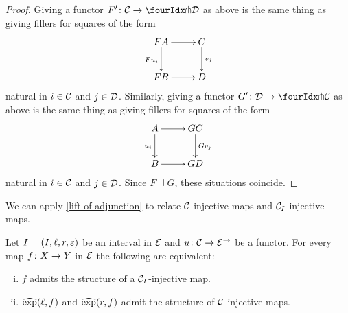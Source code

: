 \documentclass[reqno,10pt,a4paper,oneside]{amsart}
\begin{document}
\begin{proof} Giving a functor $F' \co \cal{C} \to \liftl{\cal{D}}$ as above is the same thing as giving fillers for squares of the form
\[
\xymatrix{
FA \ar[d]_{F u_i} \ar[r] & C \ar[d]^{v_j} \\
FB \ar[r] & D }
\]
natural in $i  \in \cal{C}$ and $j \in \cal{D}$. Similarly, giving a functor $G' \co \cal{D} \to \liftl{\cal{C}}$ as above is the same thing as giving fillers for squares 
of the form
\[
\xymatrix{
A \ar[d]_{u_i} \ar[r] & GC \ar[d]^{Gv_j} \\
B \ar[r] & GD }
\]
 natural in $i \in \cal{C}$ and $j \in \cal{D}$. Since $F \dashv G$, these situations coincide.
\end{proof}

We can apply \cref{lift-of-adjunction} to relate $\cal{C}$-injective maps and 
 $\cal{C}_\interval$-injective maps.


\begin{corollary} \label{prod-exp-general}
Let $\interval = (\interval, \intervall, \intervalr, \varepsilon)$ be an interval in $\catE$ and
 $u \co \cal{C} \to \catE^\to$ be a functor. For every map $f \co X \to Y$ in $\cal{E}$ 
 the following are equivalent: 
\begin{enumerate}[(i)]
\item $f$ admits the structure of a $\cal{C}_\interval$-injective map. 
\item $\hatexp(\intervall, f)$ and $\hatexp(\intervalr, f)$ admit the structure of $\cal{C}$-injective maps.
\end{enumerate} 
\end{corollary}


\medskip
\end{document}
